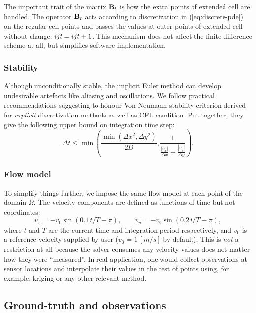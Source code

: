 \documentclass[acmsmall,review,anonymous]{acmart}\settopmatter{printfolios=true,printccs=false,printacmref=false}
\begin{document}
The important trait of the matrix ${\bf B}_t$ is how the extra points of extended cell are handled. The operator ${\bf B}_t$ acts according to discretization in (\ref{eq:discrete-pde}) on the regular cell points and passes the values at outer points of extended cell without change: $\myu{i}{j}{t} = \myu{i}{j}{t+1}$. This mechanism does not affect the finite difference scheme at all, but simplifies software implementation.
\renewcommand{\myu}{}

\subsubsection{Stability}

Although unconditionally stable, the implicit Euler method can develop undesirable artefacts like aliasing and oscillations. We follow practical recommendations suggesting to honour Von Neumann stability criterion derived for \textit{explicit} discretization methods as well as CFL condition. Put together, they give the following upper bound on integration time step:
\begin{equation}
\Delta{t} \le \min\left(
\frac{\min\left(\Delta{x}^2, \Delta{y}^2\right)}{2 D},
\frac{1}{\frac{|v_x|}{\Delta{x}} + \frac{|v_y|}{\Delta{y}}}
\right).
\label{eq:time-step}
\end{equation}

\subsubsection{Flow model}
To simplify things further, we impose the same flow model at each point of the domain $\Omega$. The velocity components are defined as functions of time but not coordinates:
\begin{equation}
v_x = -v_0 \sin{(0.1 \, t / T - \pi)}, \qquad
v_y = -v_0 \sin{(0.2 \, t / T - \pi)},
\label{eq:flow}
\end{equation}
where $t$ and $T$ are the current time and integration period respectively, and $v_0$ is a reference velocity supplied by user ($v_0$ = $1\,[m/s]$ by default). This is \textit{not} a restriction at all because the solver consumes any velocity values does not matter how they were ``measured''. In real application, one would collect observations at sensor locations and interpolate their values in the rest of points using, for example, kriging or any other relevant method.

\subsection{Ground-truth and observations}
\end{document}
